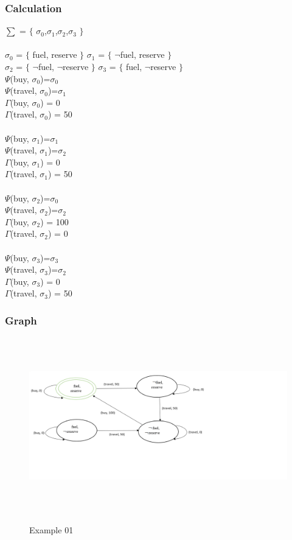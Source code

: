 \documentclass[11pt]{article}
\begin{document}
	\subsubsection{Calculation}\label{par:p301}\par
	$\sum$ = $\lbrace$ $\sigma_{0}$,$\sigma_{1}$,$\sigma_{2}$,$\sigma_{3}$ $\rbrace$\\ \\
	$\sigma_{0}$ = $\lbrace$ fuel, reserve $\rbrace$ \indent $\sigma_{1}$ = $\lbrace$ $\neg$fuel, reserve $\rbrace$\\
	$\sigma_{2}$ = $\lbrace$ $\neg$fuel, $\neg$reserve $\rbrace$ \indent 	$\sigma_{3}$ = $\lbrace$ fuel, $\neg$reserve $\rbrace$
	\\
	$\Psi$(buy, $\sigma_{0}$)=$\sigma_{0}$\\ 
	$\Psi$(travel, $\sigma_{0}$)=$\sigma_{1}$\\
	\(\Gamma\)(buy, $\sigma_{0}$) = 0\\
	\(\Gamma\)(travel, $\sigma_{0}$) = 50\\
	\\
	$\Psi$(buy, $\sigma_{1}$)=$\sigma_{1}$\\ 
	$\Psi$(travel, $\sigma_{1}$)=$\sigma_{2}$\\
	\(\Gamma\)(buy, $\sigma_{1}$) = 0\\
	\(\Gamma\)(travel, $\sigma_{1}$) = 50\\
	\\
	$\Psi$(buy, $\sigma_{2}$)=$\sigma_{0}$\\ 
	$\Psi$(travel, $\sigma_{2}$)=$\sigma_{2}$\\
	\(\Gamma\)(buy, $\sigma_{2}$) = 100\\
	\(\Gamma\)(travel, $\sigma_{2}$) = 0\\
	\\
	$\Psi$(buy, $\sigma_{3}$)=$\sigma_{3}$\\ 
	$\Psi$(travel, $\sigma_{3}$)=$\sigma_{2}$\\
	\(\Gamma\)(buy, $\sigma_{3}$) = 0\\
	\(\Gamma\)(travel, $\sigma_{3}$) = 50\\
	\subsubsection{Graph}\label{par:p401}
	\begin{figure}[H]
		\centering
		\includegraphics[width=6in,height=3in]{./media/ex01.png}
		\label{Figure:f01}
		\caption{Example 01}
	\end{figure}
\end{document}
